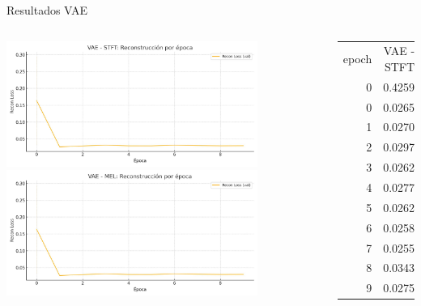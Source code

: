 \documentclass{beamer}
\begin{document}
\begin{frame}{Resultados VAE}
\begin{columns}
    \begin{center}
      \includegraphics[width=0.8\textwidth]{images/vae_stft_recon_loss_plot.png }
      \includegraphics[width=0.8\textwidth]{images/vae_mel_recon_loss_plot.png }
    \end{center}
    \column{4cm}
    \begin{table}
      \centering
      {\fontsize{6pt}{8pt}\selectfont
      \begin{tabular}{rrr}
       epoch & VAE - STFT & VAE - MEL \\
        0 &  0.4259 & 0.2955 \\
        0 &  0.0265 & 0.0315 \\
        1 &  0.0270 & 0.0265 \\
        2 &  0.0297 & 0.0294 \\
        3 &  0.0262 & 0.0319 \\
        4 &  0.0277 & 0.0298 \\
        5 &  0.0262 & 0.0297 \\
        6 &  0.0258 & 0.0318 \\
        7 &  0.0255 & 0.0306 \\
        8 &  0.0343 & 0.0299 \\
        9 &  0.0275 & 0.0301 \\
      \end{tabular}
      } 
      \end{table}
  \end{columns}
\end{frame}
\end{document}
